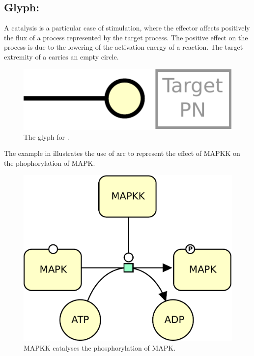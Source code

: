 \subsection{Glyph: }\label{sec:catalysis}

A catalysis is a particular case of stimulation, where the effector affects
positively the flux of a process represented by the target process. The positive effect on the process is due to the lowering of the activation energy of a reaction. The target extremity of a  carries an empty circle.

\begin{figure}[H]
  \centering
  \includegraphics[scale = 0.5]{images/catalysis}
  \caption{The \PD glyph for .}
  \label{fig:catalysis}
\end{figure}

The example in  illustrates the use of  arc to represent the effect of MAPKK on the phophorylation of MAPK.

\begin{figure}[H]
  \centering
  \includegraphics[scale = 0.5]{images/catalysis-MAPK}
  \caption{MAPKK catalyses the phosphorylation of MAPK.}
  \label{fig:catalysis-MAPK}
\end{figure}

